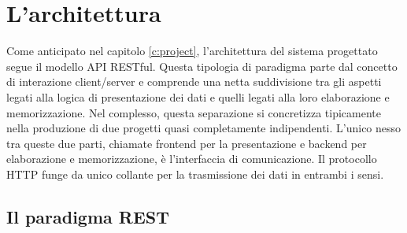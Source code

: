 \chapter{L'architettura}\label{c:architecture}

Come anticipato nel capitolo \ref{c:project}, l'architettura del sistema progettato segue il modello API RESTful.
Questa tipologia di paradigma parte dal concetto di interazione client/server e comprende una netta suddivisione tra gli aspetti legati alla logica di presentazione dei dati e quelli legati alla loro elaborazione e memorizzazione.
Nel complesso, questa separazione si concretizza tipicamente nella produzione di due progetti quasi completamente indipendenti.
L'unico nesso tra queste due parti, chiamate frontend per la presentazione e backend per elaborazione e memorizzazione, è l'interfaccia di comunicazione.
Il protocollo HTTP funge da unico collante per la trasmissione dei dati in entrambi i sensi.

\section{Il paradigma REST}

